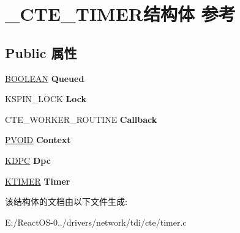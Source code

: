 \hypertarget{struct___c_t_e___t_i_m_e_r}{}\section{\+\_\+\+C\+T\+E\+\_\+\+T\+I\+M\+E\+R结构体 参考}
\label{struct___c_t_e___t_i_m_e_r}
\subsection*{Public 属性}
\begin{DoxyCompactItemize}
\item 
\mbox{\label{struct___c_t_e___t_i_m_e_r_afa980d9b24bf5389ee0c223897d9a931}} 
\hyperlink{_processor_bind_8h_a112e3146cb38b6ee95e64d85842e380a}{B\+O\+O\+L\+E\+AN} {\bfseries Queued}
\item 
\mbox{\label{struct___c_t_e___t_i_m_e_r_addc2aaeded920d9a9f304c7c98025455}} 
K\+S\+P\+I\+N\+\_\+\+L\+O\+CK {\bfseries Lock}
\item 
\mbox{\label{struct___c_t_e___t_i_m_e_r_a944d88c9f2658b7876b3a960375fcac2}} 
C\+T\+E\+\_\+\+W\+O\+R\+K\+E\+R\+\_\+\+R\+O\+U\+T\+I\+NE {\bfseries Callback}
\item 
\mbox{\label{struct___c_t_e___t_i_m_e_r_a22183da03a6ee10159e25c3445cf9bd0}} 
\hyperlink{interfacevoid}{P\+V\+O\+ID} {\bfseries Context}
\item 
\mbox{\label{struct___c_t_e___t_i_m_e_r_a9df19d25d0b695512b29db9ec908207e}} 
\hyperlink{struct___k_d_p_c}{K\+D\+PC} {\bfseries Dpc}
\item 
\mbox{\label{struct___c_t_e___t_i_m_e_r_a04b95778ab12448dfe2849a0b4759af3}} 
\hyperlink{struct___k_t_i_m_e_r}{K\+T\+I\+M\+ER} {\bfseries Timer}
\end{DoxyCompactItemize}


该结构体的文档由以下文件生成\+:\begin{DoxyCompactItemize}
\item 
E\+:/\+React\+O\+S-\/0../drivers/network/tdi/cte/timer.\+c\end{DoxyCompactItemize}
